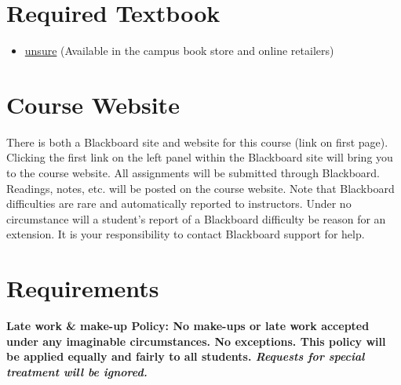\documentclass[article,oneside]{memoir}
\begin{document}
\section{Required Textbook}

\begin{itemize}
\item
  \href{unsure}{unsure}  (Available in the campus book store and online retailers)
\end{itemize}


\section{Course Website}
There is both a Blackboard site and website for this course (link on first page). Clicking the first link on the left panel within the Blackboard site will bring you to the course website. All assignments will be submitted through Blackboard. Readings, notes, etc. will be posted on the course website. Note that Blackboard difficulties are rare and automatically reported to instructors. Under no circumstance will a student's report of a Blackboard difficulty be reason for an extension. It is your responsibility to contact Blackboard support for help.




\section{Requirements}

\noindent \textbf{Late work \& make-up Policy:  No make-ups or late work accepted under any imaginable circumstances. No exceptions. This policy will be applied equally and fairly to all students. \emph{Requests for special treatment will be ignored.}}
\end{document}
